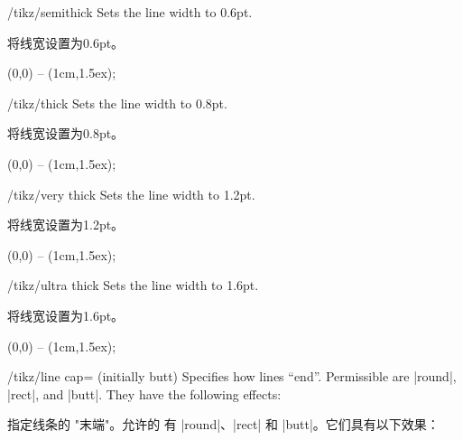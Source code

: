 \begin{stylekey}{/tikz/semithick}
    Sets the line width to 0.6pt.

    将线宽设置为0.6pt。

\begin{codeexample}[]
  \tikz \draw[semithick] (0,0) -- (1cm,1.5ex);
\end{codeexample}
\end{stylekey}

\begin{stylekey}{/tikz/thick}
    Sets the line width to 0.8pt.

    将线宽设置为0.8pt。

\begin{codeexample}[]
  \tikz \draw[thick] (0,0) -- (1cm,1.5ex);
\end{codeexample}
\end{stylekey}

\begin{stylekey}{/tikz/very thick}
    Sets the line width to 1.2pt.

    将线宽设置为1.2pt。
\begin{codeexample}[]
  \tikz {} (0,0) -- (1cm,1.5ex);
\end{codeexample}
\end{stylekey}

\begin{stylekey}{/tikz/ultra thick}
    Sets the line width to 1.6pt.

    将线宽设置为1.6pt。
\begin{codeexample}[]
  \tikz {} (0,0) -- (1cm,1.5ex);
\end{codeexample}
\end{stylekey}

    \label{section-line-cap}
\begin{key}{/tikz/line cap= (initially butt)}
    Specifies how lines ``end''. Permissible  are |round|, |rect|,
    and |butt|. They have the following effects:

    指定线条的 "末端"。允许的  有 |round|、|rect| 和 |butt|。它们具有以下效果：
\begin{codeexample}[]
\end{codeexample}
\end{key}

